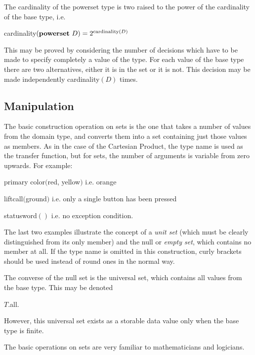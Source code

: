 \documentclass[twoside,11pt]{book}
\begin{document}
The cardinality of the powerset type is two raised to the power of the cardinality of the base type, i.e.

\quad cardinality$(\text{\textbf{powerset} } D) = 2^{\text{cardinality} (D)}$

This may be proved by considering the number of decisions which have to be made to specify completely a value of the type. For each value of the base type there are two alternatives, either it is in the set or it is not. This decision may be made independently cardinality$(D)$ times.

\subsection{Manipulation}

The basic construction operation on sets is the one that takes a number of values from the domain type, and converts them into a set containing just those values as members. As in the case of the Cartesian Product, the type name is used as the transfer function, but for sets, the number of arguments is variable from zero upwards. For example:

\quad primary color$($red, yellow$)$ \tabto*{14em} i.e. orange

\quad liftcall$($ground$)$ \tabto*{14em}  i.e. only a single button has been pressed

\quad statusword$()$ \tabto*{14em} i.e. no exception condition.

\noindent
The last two examples illustrate the concept of a \textit{unit set} (which must be clearly distinguished from its only member) and the null or \textit{empty set}, which contains no member at all. If the type name is omitted in this construction, curly brackets should be used instead of round ones in the normal way.

The converse of the null set is the universal set, which contains all values from the base type. This may be denoted

\quad $T$.all.

\noindent
However, this universal set exists as a storable data value only when the base type is finite.

The basic operations on sets are very familiar to mathematicians and logicians.
\end{document}
